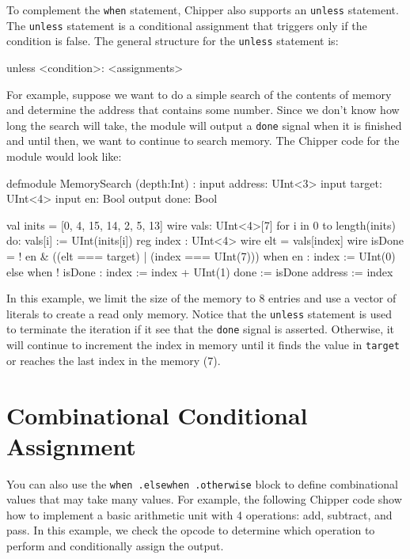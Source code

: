 
To complement the \verb+when+ statement, Chipper also supports an \verb+unless+ statement. The \verb+unless+ statement is a conditional assignment that triggers only if the condition is false. The general structure for the \verb+unless+ statement is:

\begin{stanza}
unless <condition>: <assignments>
\end{stanza}

For example, suppose we want to do a simple search of the contents of memory and determine the address that contains some number. Since we don't know how long the search will take, the module will output a \verb+done+ signal when it is finished and until then, we want to continue to search memory. The Chipper code for the module would look like:

\begin{stanza}
defmodule MemorySearch (depth:Int) :
  input  address: UInt<3>
  input  target:  UInt<4>
  input  en:      Bool
  output done:    Bool

  val inits = [0, 4, 15, 14, 2, 5, 13]
  wire vals: UInt<4>[7]
  for i in 0 to length(inits) do:
    vals[i] := UInt(inits[i])
  reg index : UInt<4>
  wire elt    = vals[index]
  wire isDone = ! en & ((elt === target) | (index === UInt(7)))
  when en :
    index := UInt(0)
  else when ! isDone :
    index := index + UInt(1)
  done    := isDone
  address := index
\end{stanza}

In this example, we limit the size of the memory to 8 entries and use a vector of literals to create a read only memory. Notice that the \verb+unless+ statement is used to terminate the iteration if it see that the \verb+done+ signal is asserted. Otherwise, it will continue to increment the index in memory until it finds the value in \verb+target+ or reaches the last index in the memory (7).

\section{Combinational Conditional Assignment}

You can also use the \verb+when .elsewhen .otherwise+ block to define combinational values that may take many values. For example, the following Chipper code show how to implement a basic arithmetic unit with 4 operations: add, subtract, and pass. In this example, we check the opcode to determine which operation to perform and conditionally assign the output.

